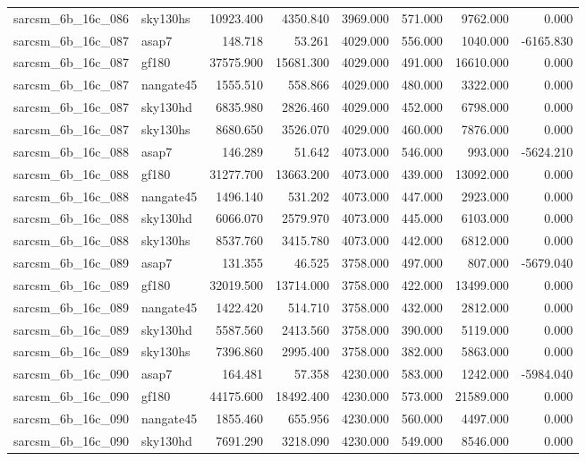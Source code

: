 \begin{tabular}{llrrrrrr}
sarcsm\_6b\_16c\_086 & sky130hs & 10923.400 & 4350.840 & 3969.000 & 571.000 & 9762.000 & 0.000 \\
sarcsm\_6b\_16c\_087 & asap7 & 148.718 & 53.261 & 4029.000 & 556.000 & 1040.000 & -6165.830 \\
sarcsm\_6b\_16c\_087 & gf180 & 37575.900 & 15681.300 & 4029.000 & 491.000 & 16610.000 & 0.000 \\
sarcsm\_6b\_16c\_087 & nangate45 & 1555.510 & 558.866 & 4029.000 & 480.000 & 3322.000 & 0.000 \\
sarcsm\_6b\_16c\_087 & sky130hd & 6835.980 & 2826.460 & 4029.000 & 452.000 & 6798.000 & 0.000 \\
sarcsm\_6b\_16c\_087 & sky130hs & 8680.650 & 3526.070 & 4029.000 & 460.000 & 7876.000 & 0.000 \\
sarcsm\_6b\_16c\_088 & asap7 & 146.289 & 51.642 & 4073.000 & 546.000 & 993.000 & -5624.210 \\
sarcsm\_6b\_16c\_088 & gf180 & 31277.700 & 13663.200 & 4073.000 & 439.000 & 13092.000 & 0.000 \\
sarcsm\_6b\_16c\_088 & nangate45 & 1496.140 & 531.202 & 4073.000 & 447.000 & 2923.000 & 0.000 \\
sarcsm\_6b\_16c\_088 & sky130hd & 6066.070 & 2579.970 & 4073.000 & 445.000 & 6103.000 & 0.000 \\
sarcsm\_6b\_16c\_088 & sky130hs & 8537.760 & 3415.780 & 4073.000 & 442.000 & 6812.000 & 0.000 \\
sarcsm\_6b\_16c\_089 & asap7 & 131.355 & 46.525 & 3758.000 & 497.000 & 807.000 & -5679.040 \\
sarcsm\_6b\_16c\_089 & gf180 & 32019.500 & 13714.000 & 3758.000 & 422.000 & 13499.000 & 0.000 \\
sarcsm\_6b\_16c\_089 & nangate45 & 1422.420 & 514.710 & 3758.000 & 432.000 & 2812.000 & 0.000 \\
sarcsm\_6b\_16c\_089 & sky130hd & 5587.560 & 2413.560 & 3758.000 & 390.000 & 5119.000 & 0.000 \\
sarcsm\_6b\_16c\_089 & sky130hs & 7396.860 & 2995.400 & 3758.000 & 382.000 & 5863.000 & 0.000 \\
sarcsm\_6b\_16c\_090 & asap7 & 164.481 & 57.358 & 4230.000 & 583.000 & 1242.000 & -5984.040 \\
sarcsm\_6b\_16c\_090 & gf180 & 44175.600 & 18492.400 & 4230.000 & 573.000 & 21589.000 & 0.000 \\
sarcsm\_6b\_16c\_090 & nangate45 & 1855.460 & 655.956 & 4230.000 & 560.000 & 4497.000 & 0.000 \\
sarcsm\_6b\_16c\_090 & sky130hd & 7691.290 & 3218.090 & 4230.000 & 549.000 & 8546.000 & 0.000 \\

\end{tabular}
